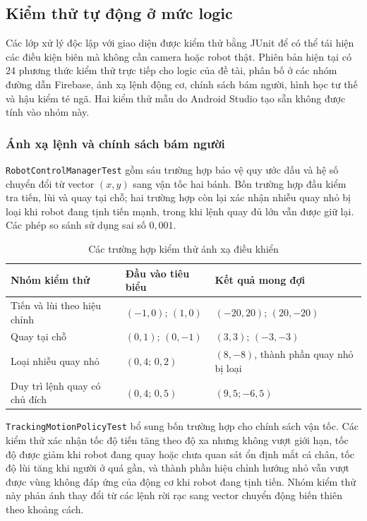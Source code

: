 \subsection{Kiểm thử tự động ở mức logic}

Các lớp xử lý độc lập với giao diện được kiểm thử bằng JUnit để có thể tái hiện các điều kiện biên mà không cần camera hoặc robot thật. Phiên bản hiện tại có 24 phương thức kiểm thử trực tiếp cho logic của đề tài, phân bố ở các nhóm đường dẫn Firebase, ánh xạ lệnh động cơ, chính sách bám người, hình học tư thế và hậu kiểm té ngã. Hai kiểm thử mẫu do Android Studio tạo sẵn không được tính vào nhóm này.

\subsubsection{Ánh xạ lệnh và chính sách bám người}

\texttt{RobotControlManagerTest} gồm sáu trường hợp bảo vệ quy ước dấu và hệ số chuyển đổi từ vector $(x,y)$ sang vận tốc hai bánh. Bốn trường hợp đầu kiểm tra tiến, lùi và quay tại chỗ; hai trường hợp còn lại xác nhận nhiễu quay nhỏ bị loại khi robot đang tịnh tiến mạnh, trong khi lệnh quay đủ lớn vẫn được giữ lại. Các phép so sánh sử dụng sai số $0,001$.

\begin{table}[htbp]
\centering
\caption{Các trường hợp kiểm thử ánh xạ điều khiển}
\label{tab:control_unit_tests}
\small
\begin{tabularx}{\textwidth}{|p{4.5cm}|p{3.2cm}|X|}
\hline
\textbf{Nhóm kiểm thử} & \textbf{Đầu vào tiêu biểu} & \textbf{Kết quả mong đợi} \\
\hline
Tiến và lùi theo hiệu chỉnh & $(-1,0)$; $(1,0)$ & $(-20,20)$; $(20,-20)$ \\
\hline
Quay tại chỗ & $(0,1)$; $(0,-1)$ & $(3,3)$; $(-3,-3)$ \\
\hline
Loại nhiễu quay nhỏ & $(0{,}4;\,0{,}2)$ & $(8,-8)$, thành phần quay nhỏ bị loại \\
\hline
Duy trì lệnh quay có chủ đích & $(0{,}4;\,0{,}5)$ & $(9{,}5;-6{,}5)$ \\
\hline
\end{tabularx}
\end{table}

\texttt{TrackingMotionPolicyTest} bổ sung bốn trường hợp cho chính sách vận tốc. Các kiểm thử xác nhận tốc độ tiến tăng theo độ xa nhưng không vượt giới hạn, tốc độ được giảm khi robot đang quay hoặc chưa quan sát ổn định mắt cá chân, tốc độ lùi tăng khi người ở quá gần, và thành phần hiệu chỉnh hướng nhỏ vẫn vượt được vùng không đáp ứng của động cơ khi robot đang tịnh tiến. Nhóm kiểm thử này phản ánh thay đổi từ các lệnh rời rạc sang vector chuyển động biến thiên theo khoảng cách.

